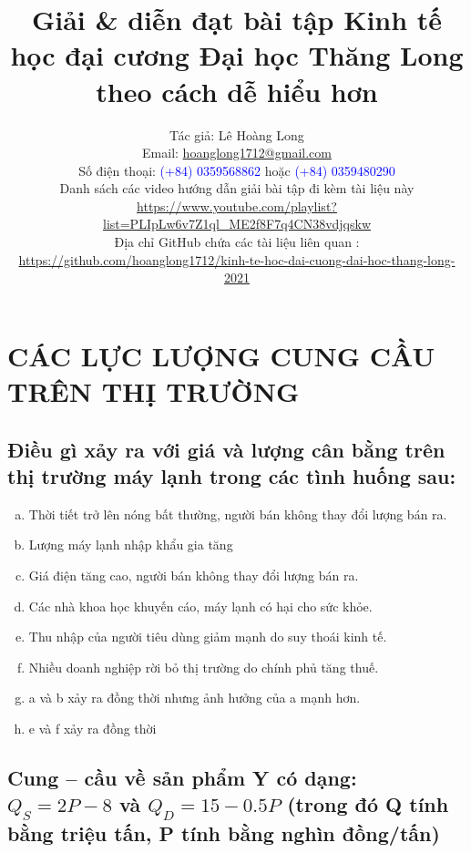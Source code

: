 \documentclass{report}
\title{Giải \& diễn đạt bài tập Kinh tế học đại cương Đại học Thăng Long theo cách dễ hiểu hơn
}
\author{Tác giả: Lê Hoàng Long \\ Email: \href{mailto:hoanglong1712@gmail.com}{hoanglong1712@gmail.com} 
\\ Số điện thoại: \textcolor{blue}{(+84) 0359568862} 
hoặc \textcolor{blue}{(+84) 0359480290} \\
Danh sách các video hướng dẫn giải bài tập đi kèm tài liệu này \\
 \url{https://www.youtube.com/playlist?list=PLIpLw6v7Z1ql_ME2f8F7q4CN38vdjqskw} \\
 Địa chỉ GitHub chứa các tài liệu liên quan : 
 \\ 
 \url{https://github.com/hoanglong1712/kinh-te-hoc-dai-cuong-dai-hoc-thang-long-2021}
 }
\date{ }
\begin{document}
\maketitle

\tableofcontents

\setcounter{chapter}{2}
\chapter{CÁC LỰC LƯỢNG 
CUNG CẦU TRÊN THỊ 
TRƯỜNG}

\section{Điều gì xảy ra với giá và lượng cân bằng trên thị trường máy lạnh trong các
  tình huống sau:}

\begin{enumerate}[(a)]
    \item Thời tiết trở lên nóng bất thường, người bán không thay đổi lượng bán ra.
    \item  Lượng máy lạnh nhập khẩu gia tăng
    \item  Giá điện tăng cao, người bán không thay đổi lượng bán ra.
    \item  Các nhà khoa học khuyến cáo, máy lạnh có hại cho sức khỏe.
    \item  Thu nhập của người tiêu dùng giảm mạnh do suy thoái kinh tế.
    \item  Nhiều doanh nghiệp rời bỏ thị trường do chính phủ tăng thuế.
    \item  a và b xảy ra đồng thời nhưng ảnh hưởng của a mạnh hơn.
    \item  e và f xảy ra đồng thời
\end{enumerate}

\section{Cung – cầu về sản phẩm Y có dạng: $Q_S = 2P - 8$ và $Q_D = 15 - 0.5P$
  (trong đó Q tính bằng triệu tấn, P tính bằng nghìn đồng/tấn)}
\end{document}
